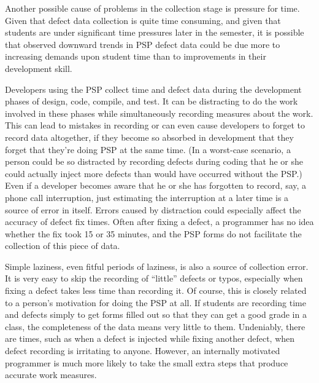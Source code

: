 Another possible cause of problems in the collection stage is pressure for
time.  Given that defect data collection is quite time consuming, and given
that students are under significant time pressures later in the semester,
it is possible that observed downward trends in PSP defect data could be
due more to increasing demands upon student time than to improvements in
their development skill.

Developers using the PSP collect time and defect data during the
development phases of design, code, compile, and test.  It can be
distracting to do the work involved in these phases while simultaneously
recording measures about the work.  This can lead to mistakes in recording
or can even cause developers to forget to record data altogether, if they
become so absorbed in development that they forget that they're doing PSP
at the same time.  (In a worst-case scenario, a person could be so
distracted by recording defects during coding that he or she could actually
inject more defects than would have occurred without the PSP.)  Even if a
developer becomes aware that he or she has forgotten to record, say, a
phone call interruption, just estimating the interruption at a later time
is a source of error in itself.  Errors caused by distraction could
especially affect the accuracy of defect fix times.  Often after fixing a
defect, a programmer has no idea whether the fix took 15 or 35 minutes, and
the PSP forms do not facilitate the collection of this piece of data.

Simple laziness, even fitful periods of laziness, is also a source of
collection error.  It is very easy to skip the recording of ``little''
defects or typos, especially when fixing a defect takes less time than
recording it.  Of course, this is closely related to a person's motivation
for doing the PSP at all.  If students are recording time and defects
simply to get forms filled out so that they can get a good grade in a
class, the completeness of the data means very little to them.  Undeniably,
there are times, such as when a defect is injected while fixing another
defect, when defect recording is irritating to anyone.  However, an
internally motivated programmer is much more likely to take the small extra
steps that produce accurate work measures.  

